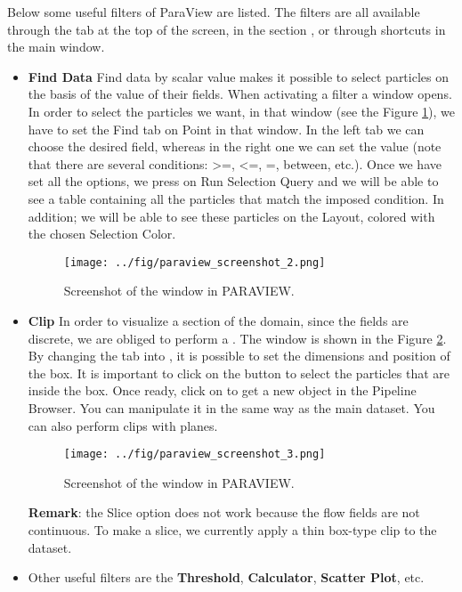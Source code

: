 \documentclass{../GPUSPHtemplate}
\begin{document}
Below some useful filters of ParaView are listed. The filters are all available 
through the  tab at the top of the screen, in the section
, or through shortcuts in the main window.
\begin{itemize} 
\item \textbf{Find Data}
Find data by scalar value makes it possible to select particles 
on the basis of the value of their fields. When activating a filter
a window opens. In order to select the particles we want, 
in that window (see the Figure \ref{fig:paraview_screenshot_2}),
we have to set the Find tab on Point in that window. 
In the left tab we can choose the desired field, whereas in the right one 
we can set the value (note that there are several conditions: >=, <=, =, between, etc.). 
Once we have set all the options, we press on Run Selection Query and we 
will be able to see a table containing all the particles that match 
the imposed condition. 
In addition; we will be able to see these particles on 
the Layout, colored with the chosen Selection Color.
\begin{figure}[h]
  \begin{center}
    \texttt{[image: ../fig/paraview\_screenshot\_2.png]}
    \caption{Screenshot of the  window in PARAVIEW.}\label{fig:paraview_screenshot_2}   
  \end{center}
\end{figure}

\item \textbf{Clip}
In order to visualize a section of the domain, 
since the fields are discrete, we are obliged to perform a .
The  window is shown in the Figure \ref{fig:paraview_screenshot_3}.  
By changing the  tab into , it is possible to set the dimensions 
and position of the box. It is important to click on the  button 
to select the particles that are inside the box. Once ready, click on 
 to get a new  object in the Pipeline Browser.
You can manipulate it in the same way as the main dataset. You can
also perform clips with planes.
\begin{figure}[h]
  \begin{center}
    \texttt{[image: ../fig/paraview\_screenshot\_3.png]}
    \caption{Screenshot of the  window in PARAVIEW.}\label{fig:paraview_screenshot_3}   
  \end{center}
\end{figure}
\textbf{Remark}: the Slice option does not work because the flow fields are not continuous.
To make a slice, we currently apply a thin box-type clip to the dataset.

\item Other useful filters are the \textbf{Threshold}, \textbf{Calculator}, \textbf{Scatter Plot}, etc.

\end{itemize}
\end{document}
